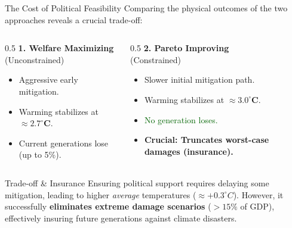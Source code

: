 \documentclass[aspectratio=169,11pt]{beamer}
\newcommand{\emphc}[1]{\textcolor{harvardcrimson}{#1}}
\newcommand{\keyc}[1]{\textcolor{uzhblue}{#1}}
\begin{document}
\begin{frame}{The Cost of Political Feasibility}
\small
    Comparing the physical outcomes of the two approaches reveals a crucial trade-off: \newline
    \begin{columns}[t]
        \begin{column}{0.5\textwidth}
            \textbf{1. Welfare Maximizing} \\ (Unconstrained)
            \begin{itemize}
                \item \keyc{Aggressive early mitigation.}
                \item Warming stabilizes at $\mathbf{\approx 2.7^\circ C}$.
                \item \emphc{Current generations lose (up to 5\%).}
            \end{itemize}
        \end{column}
        \begin{column}{0.5\textwidth}
            \textbf{2. Pareto Improving} \\ (Constrained)
            \begin{itemize}
                \item \keyc{Slower initial mitigation path.}
                \item Warming stabilizes at $\mathbf{\approx 3.0^\circ C}$.
                \item \textcolor{darkgreen}{No generation loses.}
                \item \textbf{\textcolor{softorange}{Crucial: Truncates worst-case damages (insurance).}}
            \end{itemize}
        \end{column}
    \end{columns}
    \vspace{0.8em}
    \begin{alertblock}{Trade-off \& Insurance}
        Ensuring political support requires delaying some mitigation, leading to higher \textit{average} temperatures ($\approx +0.3^\circ C$). However, it successfully \textbf{eliminates extreme damage scenarios} ($>15\%$ of GDP), effectively insuring future generations against climate disasters.
    \end{alertblock}
\end{frame}


\end{document}
